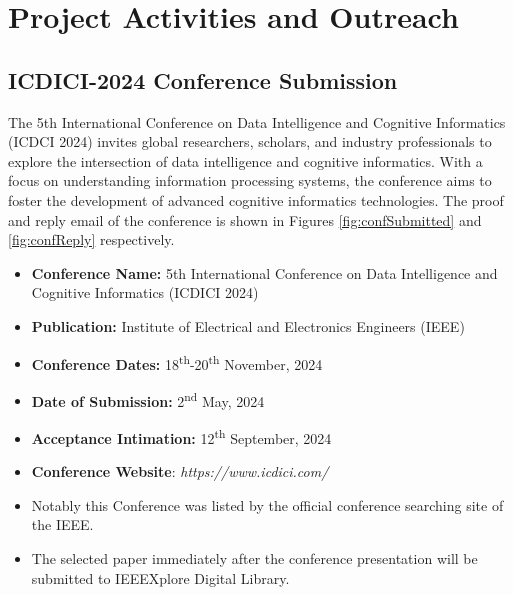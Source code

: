 \chapter{Project Activities and Outreach}
\setcounter{equation}{0}



\section{ICDICI-2024 Conference Submission}
The 5th International Conference on Data Intelligence and Cognitive Informatics (ICDCI 2024) invites global researchers, scholars, and industry professionals to explore the intersection of data intelligence and cognitive informatics. With a focus on understanding information processing systems, the conference aims to foster the development of advanced cognitive informatics technologies. The proof and reply email of the conference is shown in Figures \ref{fig:confSubmitted} and \ref{fig:confReply} respectively. 
\begin{itemize}

\item \textbf{Conference Name:} 5th International Conference on
Data Intelligence and Cognitive Informatics (ICDICI 2024)

\item \textbf{Publication:} Institute of Electrical and Electronics Engineers 
 (IEEE)

\item \textbf{Conference Dates:} 18\textsuperscript{th}-20\textsuperscript{th} November, 2024

\item \textbf{Date of Submission:} 2\textsuperscript{nd} May, 2024

\clearpage

\item \textbf{Acceptance Intimation:} 12\textsuperscript{th} September, 2024 

\item \textbf{Conference Website}: \textit{https://www.icdici.com/}

\item Notably this Conference was listed by the official conference searching site of the IEEE.

\item The selected paper immediately after the conference presentation will be submitted to IEEEXplore Digital Library.

\vspace{1cm}

\end{itemize}

